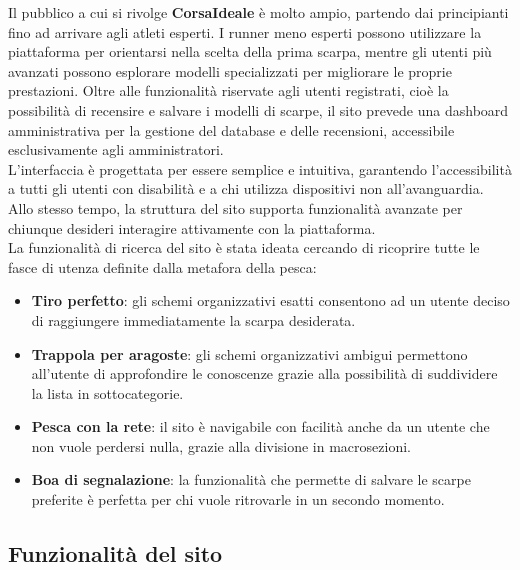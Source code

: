\documentclass[a4paper, 12pt]{article}
\begin{document}
\begin{justify}
Il pubblico a cui si rivolge \textbf{CorsaIdeale} è molto ampio, partendo dai principianti fino ad arrivare agli atleti esperti. I runner meno esperti possono utilizzare la piattaforma per orientarsi nella scelta della prima scarpa, mentre gli utenti più avanzati possono esplorare modelli specializzati per migliorare le proprie prestazioni. Oltre alle funzionalità riservate agli utenti registrati, cioè la possibilità di recensire e salvare i modelli di scarpe, il sito prevede una dashboard amministrativa per la gestione del database e delle recensioni, accessibile esclusivamente agli amministratori.\\
L'interfaccia è progettata per essere semplice e intuitiva, garantendo l'accessibilità a tutti gli utenti con disabilità e a chi utilizza dispositivi non all'avanguardia. Allo stesso tempo, la struttura del sito supporta funzionalità avanzate per chiunque desideri interagire attivamente con la piattaforma.\\
La funzionalità di ricerca del sito è stata ideata cercando di ricoprire tutte le fasce di utenza definite dalla metafora della pesca:
\begin{itemize}
    \item \textbf{Tiro perfetto}: gli schemi organizzativi esatti consentono ad un utente deciso di raggiungere immediatamente la scarpa desiderata.
    \item \textbf{Trappola per aragoste}: gli schemi organizzativi ambigui permettono all'utente di approfondire le conoscenze grazie alla possibilità di suddividere la lista in sottocategorie.
    \item \textbf{Pesca con la rete}: il sito è navigabile con facilità anche da un utente che non vuole perdersi nulla, grazie alla divisione in macrosezioni.
    \item \textbf{Boa di segnalazione}: la funzionalità che permette di salvare le scarpe preferite è perfetta per chi vuole ritrovarle in un secondo momento.
\end{itemize}

\subsection{Funzionalità del sito}


\end{justify}
\end{document}
